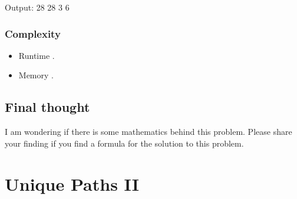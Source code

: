 \documentclass[letterpaper,12pt,english]{book}
\begin{document}
\begin{sphinxVerbatim}[commandchars=\\\{\}]
\end{sphinxVerbatim}

\begin{sphinxVerbatim}[commandchars=\\\{\}]
Output:
28
28
3
6
\end{sphinxVerbatim}


\subsubsection{Complexity}
\label{\detokenize{Dynamic_Programming/05_DP_62_Unique_Paths:id4}}\begin{itemize}
\item {} 
\sphinxAtStartPar
Runtime .

\item {} 
\sphinxAtStartPar
Memory .

\end{itemize}


\subsection{Final thought}
\label{\detokenize{Dynamic_Programming/05_DP_62_Unique_Paths:final-thought}}
\sphinxAtStartPar
I am wondering if there is some mathematics behind this problem. Please share your finding if you find a formula for the solution to this problem.

\sphinxstepscope


\section{Unique Paths II}
\label{\detokenize{Dynamic_Programming/05_DP_63_Unique_Paths_II:unique-paths-ii}}\label{\detokenize{Dynamic_Programming/05_DP_63_Unique_Paths_II::doc}}
\end{document}
